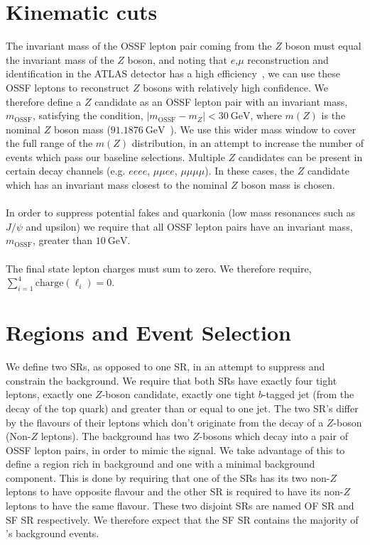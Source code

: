 \section{Kinematic cuts}
The invariant mass of the OSSF lepton pair coming from the $Z$ boson must equal the invariant mass of the $Z$ boson, and noting that $e$,$\mu$ reconstruction and identification in the ATLAS detector has a high efficiency~\cite{Marchese:2688452}, we can use these OSSF leptons to reconstruct $Z$ bosons with relatively high confidence. We therefore define a $Z$ candidate as an OSSF lepton pair with an invariant mass, $m_{\text{OSSF}}$, satisfying the condition, $|m_{\text{OSSF}} - m_Z| <  \SI{30}{\GeV}$, where $m(Z)$ is the nominal $Z$ boson mass ($\SI{91.1876}{\GeV}$~\cite{pdg}). We use this wider mass window to cover the full range of the $m(Z)$ distribution, in an attempt to increase the number of events which pass our baseline selections. Multiple $Z$ candidates can be present in certain decay channels (e.g. $eeee$, $\mu\mu ee$, $\mu \mu \mu \mu$). In these cases, the $Z$ candidate which has an invariant mass closest to the nominal $Z$ boson mass is chosen.\\\\
In order to suppress potential fakes and quarkonia (low mass resonances such as $J/\psi$ and upsilon) we require that all OSSF lepton pairs have an invariant mass, $m_{\text{OSSF}}$, greater than $\SI{10}{\GeV}$.\\\\
The final state lepton charges must sum to zero. We therefore require, $\displaystyle\sum_{i=1}^{4} \text{charge}(\ell_i) = 0$.



\section{Regions and Event Selection}
\label{sec:regionsAndEventSelection}

We define two \tWZ SRs, as opposed to one \tWZ SR, in an attempt to suppress and constrain the \ZZ background. We require that both \tWZ SRs have exactly four tight leptons, exactly one $Z$-boson candidate, exactly one tight $b$-tagged jet (from the decay of the top quark) and greater than or equal to one jet. The two \tWZ SR's differ by the flavours of their leptons which don't originate from the decay of a $Z$-boson (Non-$Z$ leptons). The \ZZ background has two $Z$-bosons which decay into a pair of OSSF lepton pairs, in order to mimic the \tWZ signal. We take advantage of this to define a \tWZ region rich in \ZZ background and one with a minimal \ZZ background component. This is done by requiring that one of the \tWZ SRs has its two non-$Z$ leptons to have opposite flavour and the other \tWZ SR is required to have its non-$Z$ leptons to have the same flavour. These two disjoint \tWZ SRs are named \tWZ OF SR and \tWZ SF SR respectively. We therefore expect that the \tWZ SF SR contains the majority of \tWZ's \ZZ background events. \\\\


